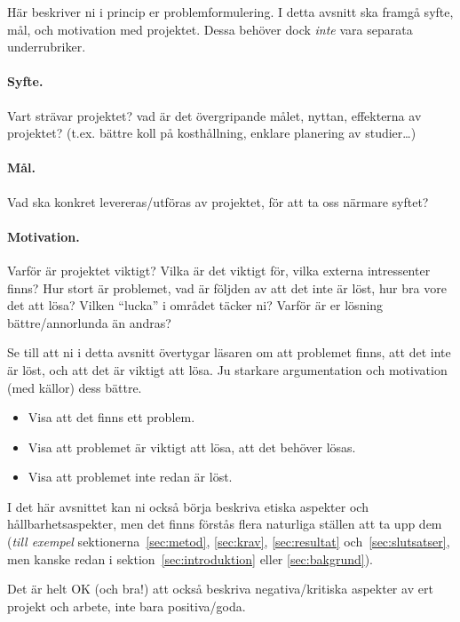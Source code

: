Här beskriver ni i princip er problemformulering.  I detta avsnitt ska framgå syfte, mål, och motivation med projektet. 
Dessa behöver dock \emph{inte} vara separata underrubriker.

\paragraph{Syfte.} Vart strävar projektet? vad är det övergripande målet, nyttan, effekterna av projektet?  (t.ex. bättre koll på kosthållning, enklare planering av studier\ldots)
\paragraph{Mål.} Vad ska konkret levereras/utföras av projektet, för att ta oss närmare syftet?
\paragraph{Motivation.}  Varför är projektet viktigt?  Vilka är det viktigt för, vilka externa intressenter finns?  Hur stort är problemet, vad är följden av att det inte är löst, hur bra vore det att lösa?  Vilken ``lucka'' i området täcker ni?
Varför är er lösning bättre/annorlunda än andras?

Se till att ni i detta avsnitt övertygar läsaren om att problemet finns, att det inte är löst, och att det är viktigt att lösa. Ju starkare argumentation och motivation (med källor) dess bättre.
\begin{itemize}
\item Visa att det finns ett problem.
\item Visa att problemet är viktigt att lösa, att det behöver lösas.
\item Visa att problemet inte redan är löst.
\end{itemize}

I det här avsnittet kan ni också börja beskriva etiska aspekter och hållbarhetsaspekter, men det finns förstås flera naturliga ställen att ta upp dem (\emph{till exempel} sektionerna~\ref{sec:metod}, \ref{sec:krav}, \ref{sec:resultat} och~\ref{sec:slutsatser}, men kanske redan i sektion~\ref{sec:introduktion} eller \ref{sec:bakgrund}).

Det är helt OK (och bra!) att också beskriva negativa/kritiska aspekter av ert projekt och arbete, inte bara positiva/goda. 

